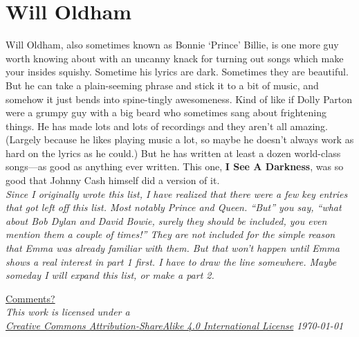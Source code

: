\documentclass[letterpaper,single]{article}
\begin{document}
\section{Will Oldham}
Will Oldham, also sometimes known as Bonnie `Prince' Billie, is one more guy worth knowing about with an uncanny knack for turning out songs which make your insides squishy. 
Sometime his lyrics are dark. 
Sometimes they are beautiful. 
But he can take a plain-seeming phrase and stick it to a bit of music, and somehow it just bends into spine-tingly awesomeness. 
Kind of like if Dolly Parton were a grumpy guy with a big beard who sometimes sang about frightening things.
He has made lots and lots of recordings and they aren't all amazing.
(Largely because he likes playing music a lot, so maybe he doesn't always work as hard on the lyrics as he could.) 
But he has written at least a dozen world-class songs---as good as anything ever written. This one, \textbf{I See A Darkness}, was so good that Johnny Cash himself did a version of it.
\\
\itshape
Since I originally wrote this list, I have realized that there were a few key entries that got left off this list.
Most notably Prince and Queen.
``But'' you say, ``what about Bob Dylan and David Bowie, surely they should be included, you even mention them a couple of times!''
They are not included for the simple reason that Emma was already familiar with them.
But that won't happen until Emma shows a real interest in part 1 first.
I have to draw the line somewhere. Maybe someday I will expand this list, or make a part 2. 
\upshape
\\
\begin{center}
  \small
  \href{mailto://kunstcleaver@gmail.com}{Comments?}\\
  \textit{This work is licensed under a \\\href{http://creativecommons.org/licenses/by-sa/4.0/}{Creative Commons Attribution-ShareAlike 4.0 International License}}
  \textit{\today}\\
\end{center}
\end{document}
